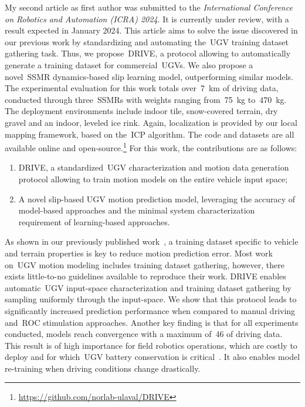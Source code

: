 My second article as first author was submitted to the \emph{International Conference on Robotics and Automation (ICRA) 2024}.
It is currently under review, with a result expected in January 2024.
This article aims to solve the issue discovered in our previous work by standardizing and automating the~\ac{UGV} training dataset gathering task.
Thus, we propose~\ac{DRIVE}, a protocol allowing to automatically generate a training dataset for commercial~\acp{UGV}.
We also propose a novel~\ac{SSMR} dynamics-based slip learning model, outperforming similar models.
The experimental evaluation for this work totals over~\SI{7}{\kilo\meter} of driving data, conducted through three~\acp{SSMR} with weights ranging from~\SI{75}{\kilo\gram} to~\SI{470}{\kilo\gram}.
The deployment environments include indoor tile, snow-covered terrain, dry gravel and an indoor, leveled ice rink.
Again, localization is provided by our local mapping framework, based on the~\ac{ICP} algorithm.
The code and datasets are all available online and open-source.\footnote{\url{https://github.com/norlab-ulaval/DRIVE}}
For this work, the contributions are as follows:
\begin{enumerate}
	\item \ac{DRIVE}, a standardized~\ac{UGV} characterization and motion data generation protocol allowing to train motion models on the entire vehicle input space;
	\item A novel slip-based \ac{UGV} motion prediction model, leveraging the accuracy of model-based approaches and the minimal system characterization requirement of learning-based approaches.
\end{enumerate}
As shown in our previously published work~\citep{Baril2020}, a training dataset specific to vehicle and terrain properties is key to reduce motion prediction error.
Most work on~\ac{UGV} motion modeling includes training dataset gathering, however, there exists little-to-no guidelines available to reproduce their work.
\ac{DRIVE} enables automatic~\ac{UGV} input-space characterization and training dataset gathering by sampling uniformly through the input-space.
We show that this protocol leads to significantly increased prediction performance when compared to manual driving and~\acf{ROC} stimulation approaches.
Another key finding is that for all experiments conducted, models reach convergence with a maximum of~\SI{46}{\sec} of driving data.
This result is of high importance for field robotics operations, which are costly to deploy and for which~\ac{UGV} battery conservation is critical~\citep{Baril2022}.
It also enables model re-training when driving conditions change drastically.

